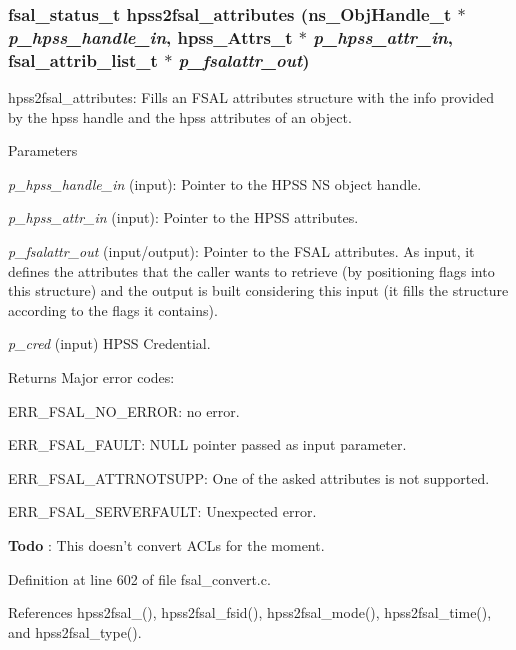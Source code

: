 \subsubsection[{hpss2fsal\_\-attributes}]{\setlength{\rightskip}{0pt plus 5cm}fsal\_\-status\_\-t hpss2fsal\_\-attributes (ns\_\-ObjHandle\_\-t $\ast$ {\em p\_\-hpss\_\-handle\_\-in}, \/  hpss\_\-Attrs\_\-t $\ast$ {\em p\_\-hpss\_\-attr\_\-in}, \/  fsal\_\-attrib\_\-list\_\-t $\ast$ {\em p\_\-fsalattr\_\-out})}\label{fsal__convert_8c_aa38d336547d49c8dc635f4a0b473fbe5}
hpss2fsal\_\-attributes: Fills an FSAL attributes structure with the info provided by the hpss handle and the hpss attributes of an object.


\begin{DoxyParams}{Parameters}
\item[{\em p\_\-hpss\_\-handle\_\-in}](input): Pointer to the HPSS NS object handle. \item[{\em p\_\-hpss\_\-attr\_\-in}](input): Pointer to the HPSS attributes. \item[{\em p\_\-fsalattr\_\-out}](input/output): Pointer to the FSAL attributes. As input, it defines the attributes that the caller wants to retrieve (by positioning flags into this structure) and the output is built considering this input (it fills the structure according to the flags it contains). \item[{\em p\_\-cred}](input) HPSS Credential.\end{DoxyParams}
\begin{DoxyReturn}{Returns}
Major error codes:
\begin{DoxyItemize}
\item ERR\_\-FSAL\_\-NO\_\-ERROR: no error.
\item ERR\_\-FSAL\_\-FAULT: NULL pointer passed as input parameter.
\item ERR\_\-FSAL\_\-ATTRNOTSUPP: One of the asked attributes is not supported.
\item ERR\_\-FSAL\_\-SERVERFAULT: Unexpected error. 
\end{DoxyItemize}
\end{DoxyReturn}


\begin{Desc}
\item[{\bf Todo}]: This doesn't convert ACLs for the moment. \end{Desc}


Definition at line 602 of file fsal\_\-convert.c.

References hpss2fsal\_(), hpss2fsal\_\-fsid(), hpss2fsal\_\-mode(), hpss2fsal\_\-time(), and hpss2fsal\_\-type().

